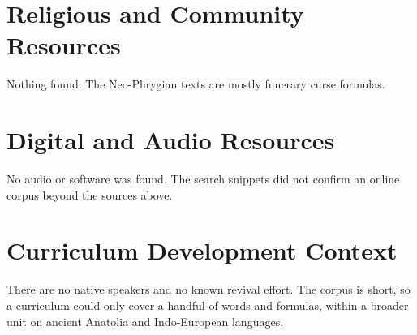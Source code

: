 \documentclass[12pt]{article}
\begin{document}
\section{Religious and Community Resources}
Nothing found. The Neo-Phrygian texts are mostly funerary curse formulas.

\section{Digital and Audio Resources}
No audio or software was found. The search snippets did not confirm an online corpus beyond the sources above.

\section{Curriculum Development Context}
There are no native speakers and no known revival effort. The corpus is short, so a curriculum could only cover a handful of words and formulas, within a broader unit on ancient Anatolia and Indo-European languages.
\end{document}
